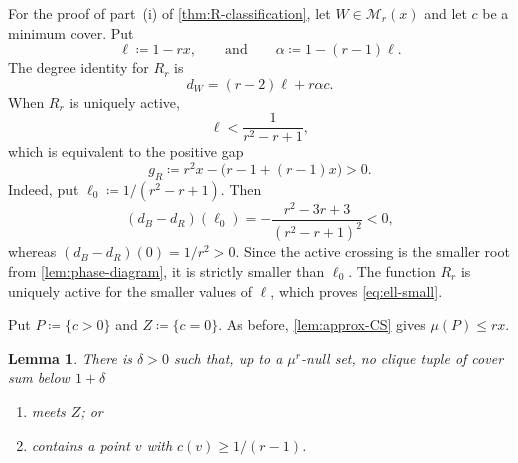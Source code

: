 \documentclass[10pt]{article}
\numberwithin{equation}{section}
\newtheorem{lemma}[lemma]{Lemma}
\newcommand{\cM}{\mathcal M}
\begin{document}
For the proof of part~\textup{(i)} of \cref{thm:R-classification}, let $W\in\cM_r(x)$ and let $c$ be a minimum cover.  Put
\[
 \ell\coloneqq1-rx,
 \qquad\text{and}\qquad
 \alpha\coloneqq1-(r-1)\ell.
\]
The degree identity for $R_r$ is
\begin{equation}\label{eq:Rdegree}
 d_W=(r-2)\ell+r\alpha c.
\end{equation}
When $R_r$ is uniquely active,
\begin{equation}\label{eq:ell-small}
 \ell<\frac1{r^2-r+1},
\end{equation}
which is equivalent to the positive gap
\begin{equation}\label{eq:R-gap}
 g_R
 \coloneqq r^2x-\bigl(r-1+(r-1)x\bigr)>0.
\end{equation}
Indeed, put $\ell_0\coloneqq1/(r^2-r+1)$.  Then
\[
 (d_B-d_R)(\ell_0)
 =-\frac{r^2-3r+3}{(r^2-r+1)^2}<0,
\]
whereas $(d_B-d_R)(0)=1/r^2>0$.  Since the active crossing is the smaller root from \cref{lem:phase-diagram}, it is strictly smaller than $\ell_0$.  The function $R_r$ is uniquely active for the smaller values of $\ell$, which proves \cref{eq:ell-small}.

Put $P\coloneqq\{c>0\}$ and $Z\coloneqq\{c=0\}$.  As before, \cref{lem:approx-CS} gives $\mu(P)\le rx$.

\begin{lemma}\label{lem:R-robust-tight}
There is $\delta>0$ such that, up to a $\mu^r$-null set, no clique tuple of cover sum below $1+\delta$
\begin{enumerate}[label=\textup{(\roman*)}]
\item meets $Z$; or
\item contains a point $v$ with $c(v)\ge1/(r-1)$.
\end{enumerate}
\end{lemma}
\end{document}

